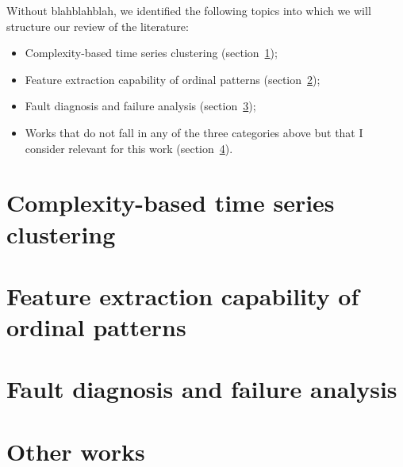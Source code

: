 Without blahblahblah, we identified the following topics into which we will structure our review of the literature:
\begin{itemize}
	\item Complexity-based time series clustering (section~\ref{Sec:ReviewTopicClustering});
	\item Feature extraction capability of ordinal patterns (section~\ref{Sec:ReviewTopicFeatureExtraction});
	\item Fault diagnosis and failure analysis (section~\ref{Sec:ReviewTopicFault});
	\item Works that do not fall in any of the three categories above but that I consider relevant for this work (section~\ref{Sec:ReviewTopicOther}).
\end{itemize}

\section{Complexity-based time series clustering}\label{Sec:ReviewTopicClustering}

\section{Feature extraction capability of ordinal patterns}\label{Sec:ReviewTopicFeatureExtraction}

\section{Fault diagnosis and failure analysis}\label{Sec:ReviewTopicFault}

\section{Other works}\label{Sec:ReviewTopicOther}